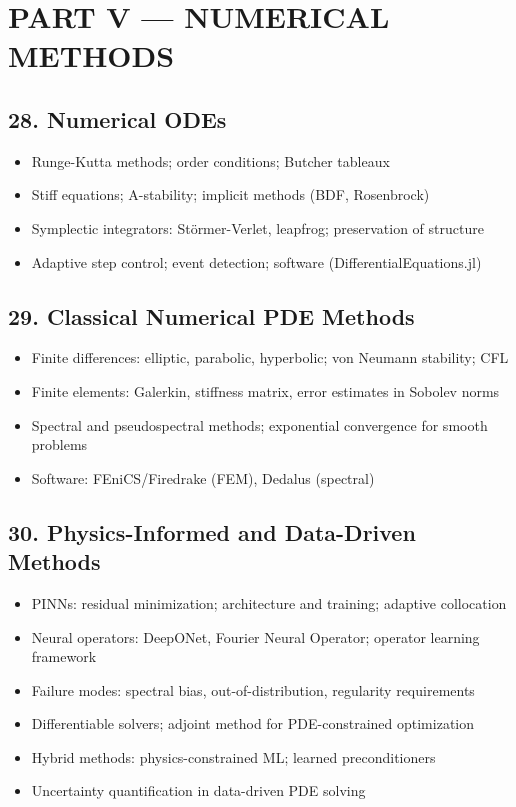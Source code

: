 \section{PART V --- NUMERICAL METHODS}

\subsection{28. Numerical ODEs}
\begin{itemize}
\item Runge-Kutta methods; order conditions; Butcher tableaux
\item Stiff equations; A-stability; implicit methods (BDF, Rosenbrock)
\item Symplectic integrators: St\"ormer-Verlet, leapfrog; preservation of structure
\item Adaptive step control; event detection; software (DifferentialEquations.jl)
\end{itemize}

\subsection{29. Classical Numerical PDE Methods}
\begin{itemize}
\item Finite differences: elliptic, parabolic, hyperbolic; von Neumann stability; CFL
\item Finite elements: Galerkin, stiffness matrix, error estimates in Sobolev norms
\item Spectral and pseudospectral methods; exponential convergence for smooth problems
\item Software: FEniCS/Firedrake (FEM), Dedalus (spectral)
\end{itemize}

\subsection{30. Physics-Informed and Data-Driven Methods}
\begin{itemize}
\item PINNs: residual minimization; architecture and training; adaptive collocation
\item Neural operators: DeepONet, Fourier Neural Operator; operator learning framework
\item Failure modes: spectral bias, out-of-distribution, regularity requirements
\item Differentiable solvers; adjoint method for PDE-constrained optimization
\item Hybrid methods: physics-constrained ML; learned preconditioners
\item Uncertainty quantification in data-driven PDE solving
\end{itemize}

